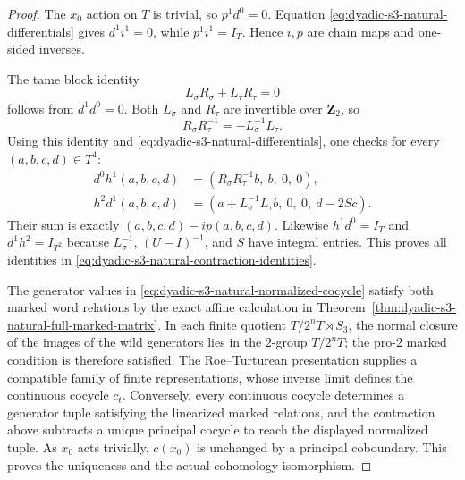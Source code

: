 \documentclass[11pt]{article}
\theoremstyle{definition}
\begin{document}
\begin{proof}
The $x_0$ action on $T$ is
trivial, so $p^1d^0=0$.
Equation
\eqref{eq:dyadic-s3-natural-differentials}
gives $d^1i^1=0$, while
$p^1i^1=I_T$.
Hence $i,p$ are chain maps
and one-sided inverses.

The tame block identity
\[
L_\sigma R_\sigma+
L_\tau R_\tau=0
\]
follows from $d^1d^0=0$.
Both $L_\sigma$ and $R_\tau$
are invertible over $\mathbf Z_2$,
so
\[
R_\sigma R_\tau^{-1}
=-L_\sigma^{-1}L_\tau.
\]
Using this identity and
\eqref{eq:dyadic-s3-natural-differentials},
one checks for every
$(a,b,c,d)\in T^4$:
\[
\begin{aligned}
d^0h^1(a,b,c,d)&=
(R_\sigma R_\tau^{-1}b,\ b,\ 0,\ 0),\\
h^2d^1(a,b,c,d)&=
(a+L_\sigma^{-1}L_\tau b,\
 0,\ 0,\ d-2Sc).
\end{aligned}
\]
Their sum is exactly
$(a,b,c,d)-i p(a,b,c,d)$.
Likewise $h^1d^0=I_T$ and
$d^1h^2=I_{T^2}$ because
$L_\sigma^{-1}$, $(U-I)^{-1}$,
and $S$ have integral entries.
This proves all identities in
\eqref{eq:dyadic-s3-natural-contraction-identities}.

The generator values in
\eqref{eq:dyadic-s3-natural-normalized-cocycle}
satisfy both marked word
relations by the exact affine
calculation in
Theorem~\ref{thm:dyadic-s3-natural-full-marked-matrix}.
In each finite quotient
$T/2^nT\rtimes S_3$, the normal
closure of the images of the
wild generators lies in the
$2$-group $T/2^nT$;
the pro-$2$ marked condition is
therefore satisfied.  The
Roe--Turturean presentation
\cite{RoeTurtureanGQ2} supplies
a compatible family of
finite representations, whose
inverse limit defines the
continuous cocycle $c_t$.
Conversely, every continuous
cocycle determines a generator
tuple satisfying the linearized
marked relations, and the
contraction above subtracts
a unique principal cocycle
to reach the displayed
normalized tuple.
As $x_0$ acts trivially,
$c(x_0)$ is unchanged by a
principal coboundary.
This proves the uniqueness
and the actual cohomology
isomorphism.
\end{proof}
\end{document}
